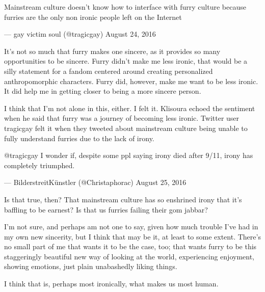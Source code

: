 Mainstream culture doesn't know how to interface with furry culture because furries are the only non ironic people left on the Internet

--- gay victim soul (@tragicgay) August 24, 2016

It's not so much that furry makes one sincere, as it provides so many opportunities to be sincere. Furry didn't make me less ironic, that would be a silly statement for a fandom centered around creating personalized anthropomorphic characters. Furry did, however, make me want to be less ironic. It did help me in getting closer to being a more sincere person.

I think that I'm not alone in this, either. I felt it. Klisoura echoed the sentiment when he said that furry was a journey of becoming less ironic. Twitter user tragicgay felt it when they tweeted about mainstream culture being unable to fully understand furries due to the lack of irony.

@tragicgay I wonder if, despite some ppl saying irony died after 9/11, irony has completely triumphed.

--- BilderstreitKünstler (@Christaphorac) August 25, 2016

Is that true, then? That mainstream culture has so enshrined irony that it's baffling to be earnest? Is that us furries failing their gom jabbar?

I'm not sure, and perhaps am not one to say, given how much trouble I've had in my own new sincerity, but I think that may be it, at least to some extent. There's no small part of me that wants it to be the case, too; that wants furry to be this staggeringly beautiful new way of looking at the world, experiencing enjoyment, showing emotions, just plain unabashedly liking things.

I think that is, perhaps most ironically, what makes us most human.
